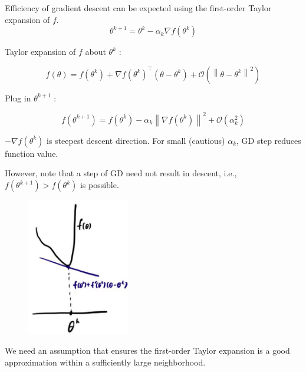 \begin{frame}[allowframebreaks]

\begin{myconceptblock}{2.2}{Efficiency of gradient descent can be expected using the first-order Taylor expansion of $f$.}
    $$
    \theta^{k+1}=\theta^{k}-\alpha_{k} \nabla f\left(\theta^{k}\right)
    $$

    Taylor expansion of $f$ about $\theta^{k}$ :

    $$
    f(\theta)=f\left(\theta^{k}\right)+\nabla f\left(\theta^{k}\right)^{\top}\left(\theta-\theta^{k}\right)+\mathcal{O}\left(\left\|\theta-\theta^{k}\right\|^{2}\right)
    $$

    Plug in $\theta^{k+1}$ :

    $$
    f\left(\theta^{k+1}\right)=f\left(\theta^{k}\right)-\alpha_{k}\left\|\nabla f\left(\theta^{k}\right)\right\|^{2}+\mathcal{O}\left(\alpha_{k}^{2}\right)
    $$

    $-\nabla f\left(\theta^{k}\right)$ is steepest descent direction. For small (cautious) $\alpha_{k}$, GD step reduces function value.
\end{myconceptblock}

\end{frame}


\begin{frame}[allowframebreaks]

However, note that a step of GD need not result in descent, i.e., $f\left(\theta^{k+1}\right)>f\left(\theta^{k}\right)$ is possible.

\begin{figure}[H]
    \centering
    \includegraphics[width=0.4\textwidth]{.././assets/2.1.png}
\end{figure}

We need an assumption that ensures the first-order Taylor expansion is a good approximation within a sufficiently large neighborhood.

\end{frame}

